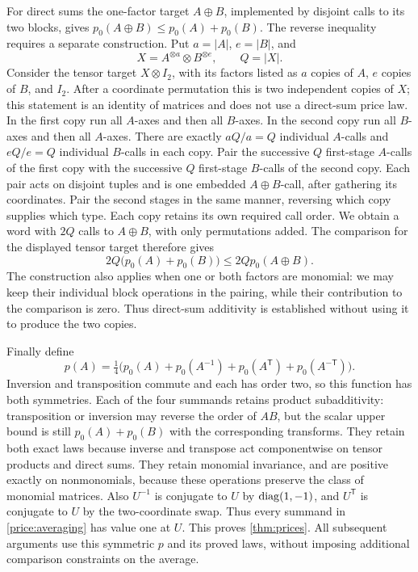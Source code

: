 For direct sums the one-factor target \(A\oplus B\), implemented
by disjoint calls to its two blocks, gives
\(p_0(A\oplus B)\leq p_0(A)+p_0(B)\).  The reverse inequality
requires a separate construction.  Put \(a=|A|\), \(e=|B|\), and
\[
 X=A^{\otimes a}\otimes B^{\otimes e},\qquad Q=|X|.
\]
Consider the tensor target \(X\otimes I_2\), with its factors listed
as \(a\) copies of \(A\), \(e\) copies of \(B\), and \(I_2\).
After a coordinate permutation this is two independent copies of \(X\); this statement
is an identity of matrices and does not use a direct-sum price law.
In the first copy run all \(A\)-axes and then all \(B\)-axes.
In the second copy run all \(B\)-axes and then all \(A\)-axes.
There are exactly \(aQ/a=Q\) individual \(A\)-calls and
\(eQ/e=Q\) individual \(B\)-calls in each copy.
Pair the successive \(Q\) first-stage \(A\)-calls of the first
copy with the successive \(Q\) first-stage \(B\)-calls of the
second copy.  Each pair acts on disjoint tuples and is one embedded
\(A\oplus B\)-call, after gathering its coordinates.  Pair the
second stages in the same manner, reversing which copy supplies which
type.  Each copy retains its own required call order.  We obtain a word
with \(2Q\) calls to \(A\oplus B\), with only permutations added.
The comparison for the displayed tensor target therefore gives
\[
 2Q\bigl(p_0(A)+p_0(B)\bigr)
       \leq2Qp_0(A\oplus B).
\]
The construction also applies when one or both factors are monomial:
we may keep their individual block operations in the pairing, while
their contribution to the comparison is zero.  Thus direct-sum
additivity is established without using it to produce the two copies.

Finally define
\begin{equation}
 p(A)=\tfrac14\bigl(p_0(A)+p_0(A^{-1})
                 +p_0(A^{\mathsf T})+p_0(A^{-\mathsf T})\bigr).
 \label{price:averaging}
\end{equation}
Inversion and transposition commute and each has order two, so this
function has both symmetries.  Each of the four summands retains product
subadditivity: transposition or inversion may reverse the order of
\(AB\), but the scalar upper bound is still \(p_0(A)+p_0(B)\)
with the corresponding transforms.  They retain both exact laws because
inverse and transpose act componentwise on tensor products and direct
sums.  They retain monomial invariance, and are positive exactly on
nonmonomials, because these operations preserve the class of monomial
matrices.  Also \(U^{-1}\) is conjugate to \(U\) by
\(\operatorname{diag}(1,-1)\), and \(U^{\mathsf T}\) is conjugate to \(U\)
by the two-coordinate swap.  Thus every summand in
\cref{price:averaging} has value one at \(U\).  This proves
\cref{thm:prices}.  All subsequent arguments use this symmetric \(p\)
and its proved laws, without imposing additional comparison constraints
on the average.

